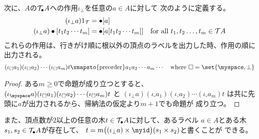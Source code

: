 	次に、$A$の$\mathcal{T}_\bullet A$への作用$\iota_\perp$を任意の$a\in A$に対して
	次のように定義する。
	\begin{equation*}\begin{split} %
		(\iota_\perp a)\treeu &= \bullet\word{a} \\
		(\iota_\perp a)\bullet\word{t_1t_2\cdots t_m}
		&= \bullet\word{a\word{t_1t_2\cdots t_m}}
		\quad\text{for all }t_1,t_2\dots,t_m\in\Tree A
	\end{split}\end{equation*} %
	これらの作用は、行きがけ順に根以外の頂点のラベルを出力した時、作用の順に
	出力される。
	\begin{equation*}\begin{split} %
		(\iota_\square a_1)(\iota_\square a_2)\cdots(\iota_\square a_m)t
		\xmapsto{\text{preorder}} a_1a_2\cdots a_m\cdots
		\quad\text{where }\square=\set{\myspace,\perp}
	\end{split}\end{equation*} %
	\begin{proof} %
		ある$m\ge0$で命題が成り立つとすると、
		$(\iota_\myspace a)(\iota_\square a_1)(\iota_\square a_2)\cdots(\iota_\square a_m)t$
		と
		$(\iota_\perp a)(\iota_\square a_1)(\iota_\square a_2)\cdots(\iota_\square a_m)t$
		は共に先頭に$a$が出力されるから、帰納法の仮定より$m+1$でも命題が
		成り立つ。
	\end{proof} %
	また、頂点数が$2$以上の任意の木$t\in\mathcal{T}_\bullet A$に対して、あるラベル
	$a\in A$とある木$s_1,s_2\in\mathcal{T}_\bullet A$が存在して、
	$t=m\bigl((\iota_\perp a)\times\myid\bigr)(s_1\times s_2)$と書くことが
	できる。

